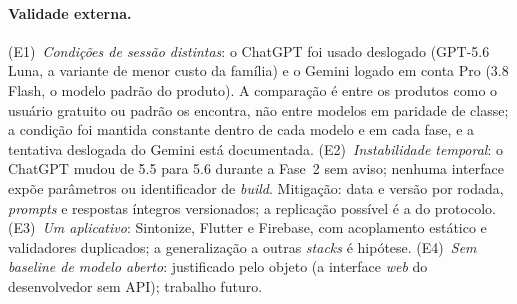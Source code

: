 \documentclass[12pt]{article}
\begin{document}
\paragraph{Validade externa.} (E1)~\emph{Condições de sessão distintas}: o
ChatGPT foi usado deslogado (GPT-5.6 Luna, a variante de menor custo da
família) e o Gemini logado em conta Pro (3.8 Flash, o modelo padrão do
produto). A comparação é entre os produtos como o usuário gratuito ou padrão
os encontra, não entre modelos em paridade de classe; a condição foi mantida
constante dentro de cada modelo e em cada fase, e a tentativa deslogada do
Gemini está documentada. (E2)~\emph{Instabilidade temporal}: o ChatGPT mudou
de 5.5 para 5.6 durante a Fase~2 sem aviso; nenhuma interface expõe
parâmetros ou identificador de \textit{build}. Mitigação: data e versão por
rodada, \textit{prompts} e respostas íntegros versionados; a replicação
possível é a do protocolo. (E3)~\emph{Um aplicativo}: Sintonize, Flutter e
Firebase, com acoplamento estático e validadores duplicados; a
generalização a outras \textit{stacks} é hipótese. (E4)~\emph{Sem \textit{baseline}
de modelo aberto}: justificado pelo objeto (a interface \textit{web} do
desenvolvedor sem API); trabalho futuro.
\end{document}
